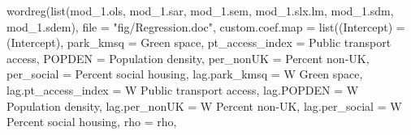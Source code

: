 \documentclass[
  letterpaper,
]{scrbook}
\newenvironment{Shaded}{\begin{snugshade}}{\end{snugshade}}
\newcommand{\AttributeTok}[1]{\textcolor[rgb]{0.40,0.45,0.13}{#1}}
\newcommand{\FunctionTok}[1]{\textcolor[rgb]{0.28,0.35,0.67}{#1}}
\newcommand{\NormalTok}[1]{\textcolor[rgb]{0.00,0.23,0.31}{#1}}
\newcommand{\OtherTok}[1]{\textcolor[rgb]{0.00,0.23,0.31}{#1}}
\newcommand{\StringTok}[1]{\textcolor[rgb]{0.13,0.47,0.30}{#1}}
\begin{document}
\begin{Shaded}
\begin{Highlighting}[]
\FunctionTok{wordreg}\NormalTok{(}\FunctionTok{list}\NormalTok{(mod\_1.ols, mod\_1.sar, mod\_1.sem, mod\_1.slx.lm, mod\_1.sdm, mod\_1.sdem),}
        \AttributeTok{file =} \StringTok{"fig/Regression.doc"}\NormalTok{,}
          \AttributeTok{custom.coef.map =} \FunctionTok{list}\NormalTok{(}\StringTok{\textquotesingle{}(Intercept)\textquotesingle{}} \OtherTok{=}  \StringTok{\textquotesingle{}(Intercept)\textquotesingle{}}\NormalTok{,}
                                 \StringTok{\textquotesingle{}park\_kmsq\textquotesingle{}} \OtherTok{=}  \StringTok{\textquotesingle{}Green space\textquotesingle{}}\NormalTok{,}
                                 \StringTok{\textquotesingle{}pt\_access\_index\textquotesingle{}} \OtherTok{=}  \StringTok{\textquotesingle{}Public transport access\textquotesingle{}}\NormalTok{,}
                                 \StringTok{\textquotesingle{}POPDEN\textquotesingle{}} \OtherTok{=}  \StringTok{\textquotesingle{}Population density\textquotesingle{}}\NormalTok{,}
                                 \StringTok{\textquotesingle{}per\_nonUK\textquotesingle{}} \OtherTok{=}  \StringTok{\textquotesingle{}Percent non{-}UK\textquotesingle{}}\NormalTok{,}
                                 \StringTok{\textquotesingle{}per\_social\textquotesingle{}} \OtherTok{=} \StringTok{\textquotesingle{}Percent social housing\textquotesingle{}}\NormalTok{,}
                                 \StringTok{\textquotesingle{}lag.park\_kmsq\textquotesingle{}} \OtherTok{=}  \StringTok{\textquotesingle{}W Green space\textquotesingle{}}\NormalTok{,}
                                 \StringTok{\textquotesingle{}lag.pt\_access\_index\textquotesingle{}} \OtherTok{=}  \StringTok{\textquotesingle{}W Public transport access\textquotesingle{}}\NormalTok{,}
                                 \StringTok{\textquotesingle{}lag.POPDEN\textquotesingle{}} \OtherTok{=}  \StringTok{\textquotesingle{}W Population density\textquotesingle{}}\NormalTok{,}
                                 \StringTok{\textquotesingle{}lag.per\_nonUK\textquotesingle{}} \OtherTok{=}  \StringTok{\textquotesingle{}W Percent non{-}UK\textquotesingle{}}\NormalTok{,}
                                 \StringTok{\textquotesingle{}lag.per\_social\textquotesingle{}} \OtherTok{=} \StringTok{\textquotesingle{}W Percent social housing\textquotesingle{}}\NormalTok{,}
                                 \StringTok{\textquotesingle{}rho\textquotesingle{}} \OtherTok{=} \StringTok{\textquotesingle{}rho\textquotesingle{}}\NormalTok{,}

\end{Highlighting}
\end{Shaded}
\end{document}
